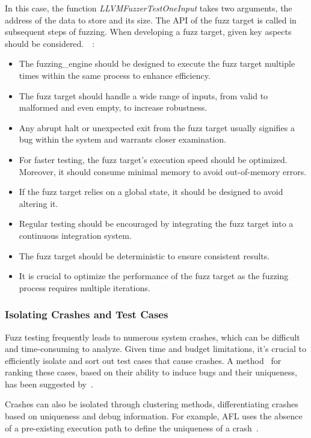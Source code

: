In this case, the function \textit{LLVMFuzzerTestOneInput} takes two arguments,
the address of the data to store and its size. The API of the fuzz target is
called in subsequent steps of fuzzing. When developing a fuzz target, given
key aspects should be considered.~\cite{libFuzze17:online}~\cite{257204}:

\begin{itemize}
\item The \gls{fuzzing_engine} should be designed to execute the fuzz target
multiple times within the same process to enhance efficiency.
\item The fuzz target should handle a wide range of inputs, from valid to
malformed and even empty, to increase robustness.
\item Any abrupt halt or unexpected exit from the fuzz target usually
signifies a bug within the system and warrants closer examination.
\item For faster testing, the fuzz target's execution speed should be
optimized. Moreover, it should consume minimal memory to avoid out-of-memory errors.
\item If the fuzz target relies on a global state, it should be
designed to avoid altering it.
\item Regular testing should be encouraged by integrating the fuzz
target into a continuous integration system.
\item The fuzz target should be deterministic to ensure consistent results.
\item It is crucial to optimize the performance of the fuzz target as the
fuzzing process requires multiple iterations.
\end{itemize}

\subsubsection{Isolating Crashes and Test Cases}
Fuzz testing frequently leads to numerous system crashes, which can be difficult
and time-consuming to analyze. Given time and budget limitations, it's crucial
to efficiently isolate and sort out test cases that cause crashes. A method~\cite{chen2013taming}
for ranking these cases, based on their ability to induce bugs and their uniqueness,
has been suggested by~.

Crashes can also be isolated through clustering methods, differentiating
crashes based on uniqueness and debug information. For example, AFL uses the absence
of a pre-existing execution path to define the uniqueness of a crash~\cite{GitHubgo92:online}.

